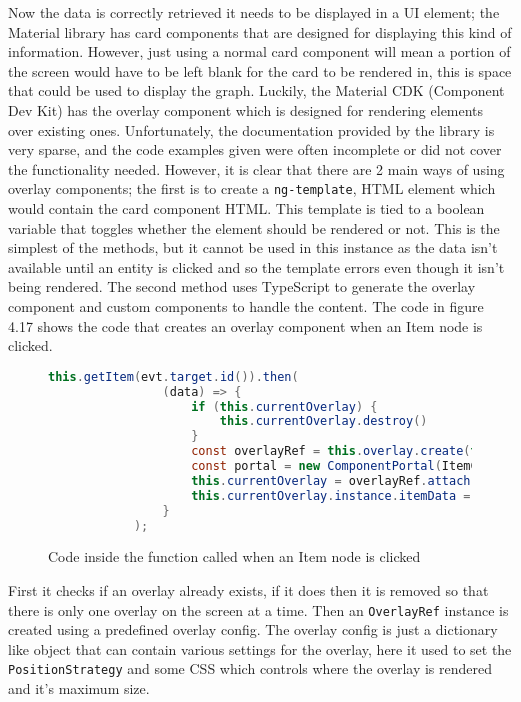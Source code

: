 Now the data is correctly retrieved it needs to be displayed in a UI element; the Material library has card components that are 
designed for displaying this kind of information. However, just using a normal card component will mean a portion of the screen 
would have to be left blank for the card to be rendered in, this is space that could be used to display the graph. Luckily, the Material CDK (Component Dev Kit) 
has the overlay component which is designed for rendering elements over existing ones. Unfortunately, the documentation provided by 
the library is very sparse, and the code examples given were often incomplete or did not cover the functionality needed. 
However, it is clear that there are 2 main ways of using overlay components; the first is to create a \verb|ng-template|, 
HTML element which would contain the card component HTML. This template is tied to a boolean variable that toggles whether the element should be rendered or not.
This is the simplest of the methods, but it cannot be used in this instance as the data isn't available until an entity is clicked and so the template errors 
even though it isn't being rendered. The second method uses TypeScript to generate the overlay component and custom components to handle the content. 
The code in figure 4.17 shows the code that creates an overlay component when an Item node is clicked.
\begin{figure}[!htbp]
    \begin{lstlisting}[language=Java]
        this.getItem(evt.target.id()).then(
                (data) => {
                    if (this.currentOverlay) {
                        this.currentOverlay.destroy()
                    }
                    const overlayRef = this.overlay.create(this.overlayConfig);
                    const portal = new ComponentPortal(ItemComponent);
                    this.currentOverlay = overlayRef.attach(portal);
                    this.currentOverlay.instance.itemData = data;
                }
            );
    \end{lstlisting}
    \caption{Code inside the function called when an Item node is clicked}
\end{figure}
First it checks if an overlay already exists, if it does then it is removed so that there is only one overlay on the screen at a time. 
Then an \verb|OverlayRef| instance is created using a predefined overlay config. The overlay config is just a dictionary like object that can contain 
various settings for the overlay, here it used to set the \verb|PositionStrategy| and some CSS which controls where the overlay is rendered and it's maximum size.
